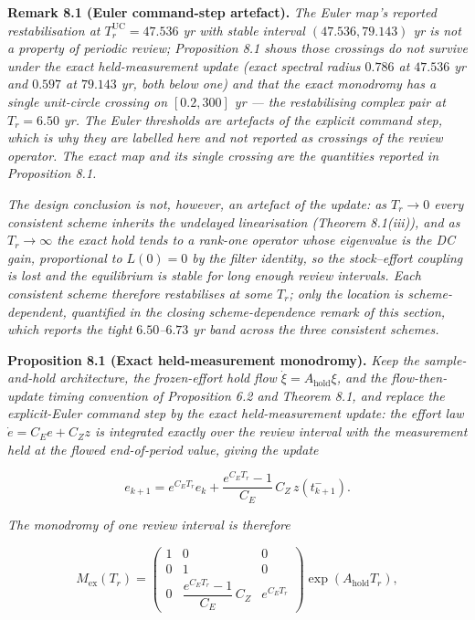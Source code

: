 \documentclass[11pt]{article}
\begin{document}
\textbf{Remark 8.1 (Euler command-step artefact).} \emph{The Euler map's
reported restabilisation at \(T_r^{\mathrm{UC}} = 47.536\) yr with
stable interval \((47.536, 79.143)\) yr is not a property of periodic
review; Proposition 8.1 shows those crossings do not survive under the
exact held-measurement update (exact spectral radius \(0.786\) at
\(47.536\) yr and \(0.597\) at \(79.143\) yr, both below one) and that
the exact monodromy has a single unit-circle crossing on \([0.2, 300]\)
yr --- the restabilising complex pair at \(T_r = 6.50\) yr. The Euler
thresholds are artefacts of the explicit command step, which is why they
are labelled here and not reported as crossings of the review operator.
The exact map and its single crossing are the quantities reported in
Proposition 8.1.}

\emph{The design conclusion is not, however, an artefact of the update:
as \(T_r \to 0\) every consistent scheme inherits the undelayed
linearisation (Theorem 8.1(iii)), and as \(T_r \to \infty\) the exact
hold tends to a rank-one operator whose eigenvalue is the DC gain,
proportional to \(L(0) = 0\) by the filter identity, so the
stock--effort coupling is lost and the equilibrium is stable for long
enough review intervals. Each consistent scheme therefore restabilises
at some \(T_r\); only the location is scheme-dependent, quantified in
the closing scheme-dependence remark of this section, which reports the
tight \(6.50\)--\(6.73\) yr band across the three consistent schemes.}

\textbf{Proposition 8.1 (Exact held-measurement monodromy).} \emph{Keep
the sample-and-hold architecture, the frozen-effort hold flow
\(\dot\xi = A_{\mathrm{hold}}\xi\), and the flow-then-update timing
convention of Proposition 6.2 and Theorem 8.1, and replace the
explicit-Euler command step by the exact held-measurement update: the
effort law \(\dot e = C_E e + C_Z z\) is integrated exactly over the
review interval with the measurement held at the flowed end-of-period
value, giving the update}

\[e_{k+1} = e^{C_E T_r} e_k + \frac{e^{C_E T_r} - 1}{C_E}\, C_Z\, z(t_{k+1}^-).\]

\emph{The monodromy of one review interval is therefore}

\[M_{\mathrm{ex}}(T_r) = \begin{pmatrix} 1 & 0 & 0 \\ 0 & 1 & 0 \\ 0 & \dfrac{e^{C_E T_r}-1}{C_E}\,C_Z & e^{C_E T_r} \end{pmatrix} \exp(A_{\mathrm{hold}} T_r), \tag{13}\]
\end{document}
